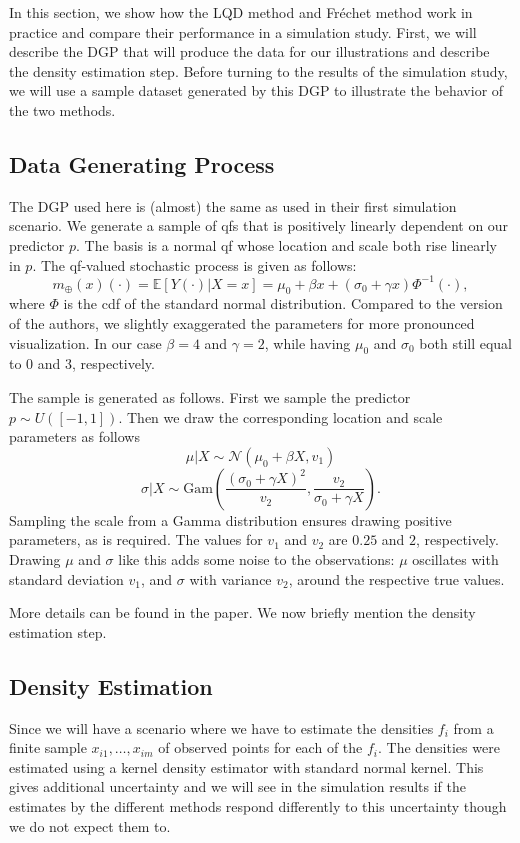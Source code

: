 In this section, we show how the LQD method and Fréchet method work in practice and
compare their performance in a simulation study. First, we will describe the DGP that
will produce the data for our illustrations and describe the density estimation step.
Before turning to the results of the simulation study, we will use a sample dataset
generated by this DGP to illustrate the behavior of the two methods.

\subsection{Data Generating Process}
\label{sec:app_dgp}
The DGP used here is (almost) the same as \textcite{PetersenMüller2019} used in their first simulation
scenario. We generate a sample of qfs that is positively linearly dependent on our predictor
$p$. The basis is a normal qf whose location and scale both rise linearly in
$p$. The qf-valued stochastic process is given as follows:
\[
    m_{\oplus}(x)(\cdot) = \mathbb{E}[Y(\cdot)|X = x] = \mu_0 + \beta x + (\sigma_0 + \gamma x) \Phi^{-1}(\cdot),
\]
where $\Phi$ is the cdf of the standard normal distribution.
Compared to the version of the authors, we slightly exaggerated the parameters for more pronounced visualization. In our case
$\beta = 4$ and $\gamma = 2$, while having $\mu_0$ and $\sigma_0$ both still equal to 0 and 3, respectively.

The sample is generated as follows. First we sample the predictor $p \sim U([-1,1])$.
Then we draw the corresponding location and scale parameters as follows
\[
    \mu|X \sim \mathcal{N}(\mu_0 + \beta X, v_1)
\]
\[
    \sigma|X \sim \text{Gam} \left( \frac{( \sigma_0 + \gamma X )^2}{v_2}, \frac{v_2}{\sigma_0 + \gamma X} \right).
\]
Sampling the scale from a Gamma distribution ensures drawing positive parameters, as is
required. The values for $v_1$ and $v_2$ are $0.25$ and $2$, respectively. Drawing $\mu$ and
$\sigma$ like this adds some noise to the observations: $\mu$ oscillates with standard
deviation $v_1$, and $\sigma$ with variance $v_2$, around the respective true values.

More details can be found in the paper. We now briefly mention the density estimation
step.

\subsection{Density Estimation}
\label{sec:app_density_estimation}
Since we will have a scenario where we have to estimate the densities $f_i$ from a finite sample
$x_{i1},\dots, x_{im}$ of observed points for each of the $f_i$. The densities were
estimated using a kernel density estimator with standard normal kernel. This gives
additional uncertainty and we will see in the simulation results if the estimates
by the different methods respond differently to this uncertainty though we do not expect them
to.

